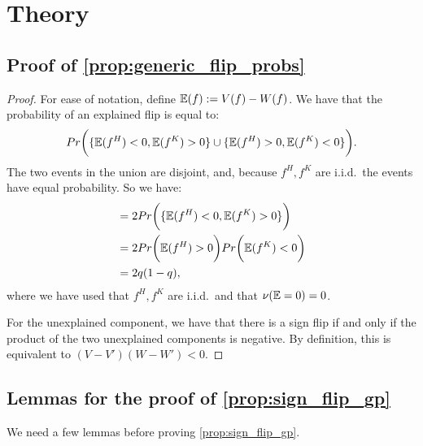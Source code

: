 \section{Theory}
\label{app:theory}

\subsection{Proof of \cref{prop:generic_flip_probs}}
\label{app:proof_generic_flip_probs}

\begin{proof}
	For ease of notation, define $\mathbb{E}(f) := V(f) - W(f)$. We have that the probability of an explained flip is equal to:
	\begin{equation*}
		Pr\bigg( \{\mathbb{E}(f^H) < 0, \mathbb{E}(f^K) > 0 \} \cup \{ \mathbb{E}(f^H) > 0, \mathbb{E}(f^K) < 0\} \bigg).
	\end{equation*}
	The two events in the union are disjoint, and, because $f^H, f^K$ are i.i.d.\, the events have equal probability. So we have:
	\begin{align*}
		&= 2 Pr\bigg( \{\mathbb{E}(f^H) < 0, \mathbb{E}(f^K) > 0 \} \bigg) \\
		&= 2 Pr\bigg( \mathbb{E}(f^H) > 0 \bigg) Pr\bigg( \mathbb{E}(f^K) < 0 \bigg) \\
		&= 2 q (1 - q),
	\end{align*}
	where we have used that $f^H, f^K$ are i.i.d.\ and that $\nu(\mathbb{E} = 0) = 0$.
	
	For the unexplained component, we have that there is a sign flip if and only if the product of the two unexplained components is negative. By definition, this is equivalent to $(V - V')(W - W') < 0$.
\end{proof}

\subsection{Lemmas for the proof of \cref{prop:sign_flip_gp}}

We need a few lemmas before proving \cref{prop:sign_flip_gp}.

